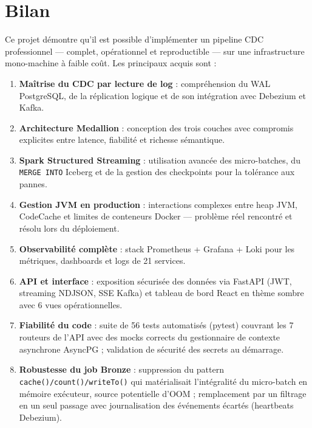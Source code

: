 \documentclass[12pt,a4paper]{report}
\begin{document}
\section{Bilan}

Ce projet démontre qu'il est possible d'implémenter un pipeline CDC
professionnel --- complet, opérationnel et reproductible --- sur une
infrastructure mono-machine à faible coût. Les principaux acquis sont :

\begin{enumerate}
    \item \textbf{Maîtrise du CDC par lecture de log} : compréhension du WAL
          PostgreSQL, de la réplication logique et de son intégration avec
          Debezium et Kafka.

    \item \textbf{Architecture Medallion} : conception des trois couches avec
          compromis explicites entre latence, fiabilité et richesse sémantique.

    \item \textbf{Spark Structured Streaming} : utilisation avancée des
          micro-batches, du \texttt{MERGE INTO} Iceberg et de la gestion des
          checkpoints pour la tolérance aux pannes.

    \item \textbf{Gestion JVM en production} : interactions complexes entre
          heap JVM, CodeCache et limites de conteneurs Docker --- problème réel
          rencontré et résolu lors du déploiement.

    \item \textbf{Observabilité complète} : stack Prometheus + Grafana + Loki
          pour les métriques, dashboards et logs de 21 services.

    \item \textbf{API et interface} : exposition sécurisée des données via
          FastAPI (JWT, streaming NDJSON, SSE Kafka) et tableau de bord
          React en thème sombre avec 6 vues opérationnelles.

    \item \textbf{Fiabilité du code} : suite de 56 tests automatisés
          (pytest) couvrant les 7 routeurs de l'API avec des mocks corrects
          du gestionnaire de contexte asynchrone AsyncPG ; validation de
          sécurité des secrets au démarrage.

    \item \textbf{Robustesse du job Bronze} : suppression du pattern
          \texttt{cache()/count()/writeTo()} qui matérialisait l'intégralité
          du micro-batch en mémoire exécuteur, source potentielle d'OOM ;
          remplacement par un filtrage en un seul passage avec journalisation
          des événements écartés (heartbeats Debezium).
\end{enumerate}
\end{document}
